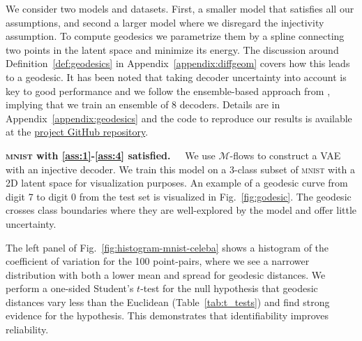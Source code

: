 We consider two models and datasets. First, a smaller model that satisfies all our assumptions, and second a larger model where we disregard the injectivity assumption. %
To compute geodesics we parametrize them by a spline connecting two points in the latent space and minimize its energy. The discussion around Definition~\ref{def:geodesics} in Appendix~\ref{appendix:diffgeom} covers how this leads to a geodesic. %
It has been noted that taking decoder uncertainty into account is key to good performance \citep{arvanitidis2021latentspaceodditycurvature, hauberg:only:2018} and we follow the ensemble-based approach from \citet{pmlr-v251-syrota24a}, implying that we train an ensemble of 8 decoders. Details are in Appendix~\ref{appendix:geodesics} and the code to reproduce our results is available at the \href{https://github.com/mustass/identifiable-latent-metric-space/}{project GitHub repository}.  

\textbf{\textsc{mnist} with \ref{ass:1}-\ref{ass:4} satisfied.~~}
We use $\mathcal{M}$-flows \citep{brehmer2020flows} to construct a VAE with an injective decoder. %
%
We train this model on a 3-class subset of \textsc{mnist} with a 2D latent space for visualization purposes. An example of a geodesic curve from digit 7 to digit 0 from the test set is visualized in Fig.~\ref{fig:godesic}. The geodesic crosses class boundaries where they are well-explored by the model and offer little uncertainty.

The left panel of Fig.~\ref{fig:histogram-mnist-celeba} shows a histogram of the coefficient of variation for the 100 point-pairs,  where we see a narrower distribution with both a lower mean and spread for geodesic distances. We perform a one-sided Student's $t$-test for the null hypothesis that geodesic distances vary less than the Euclidean (Table~\ref{tab:t_tests}) and find strong evidence for the hypothesis. This demonstrates that identifiability improves reliability.


